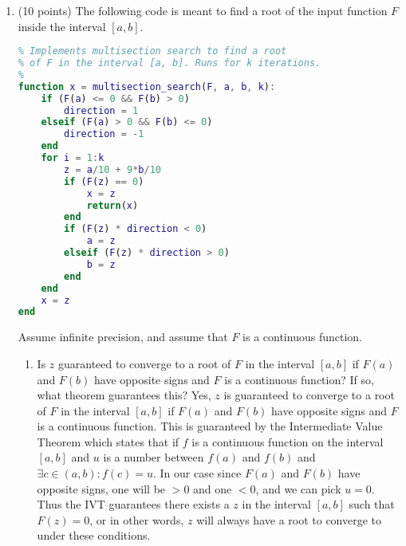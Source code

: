 \documentclass{article}
\begin{document}
\begin{enumerate}
    \newpage
    \item (10 points) The following code is meant to find a root of the input function $F$ inside the interval $[a, b]$.
    \begin{lstlisting}[language=MATLAB]
%
% Implements multisection search to find a root
% of F in the interval [a, b]. Runs for k iterations.
%
function x = multisection_search(F, a, b, k):
    if (F(a) <= 0 && F(b) > 0)
        direction = 1
    elseif (F(a) > 0 && F(b) <= 0)
        direction = -1
    end
    for i = 1:k
        z = a/10 + 9*b/10
        if (F(z) == 0)
            x = z
            return(x)
        end
        if (F(z) * direction < 0)
            a = z
        elseif (F(z) * direction > 0)
            b = z
        end
    end
    x = z
end
    \end{lstlisting}
    Assume infinite precision, and assume that $F$ is a continuous function.
    \begin{enumerate}
        \item Is $z$ guaranteed to converge to a root of $F$ in the interval $[a, b]$ if $F(a)$ and $F(b)$ have opposite signs and $F$ is a continuous function? If so, what theorem guarantees this?
        \newline
        \newline
        Yes, $z$ is guaranteed to converge to a root of $F$ in the interval $[a, b]$ if $F(a)$ and $F(b)$ have opposite signs and $F$ is a continuous function. This is guaranteed by the Intermediate Value Theorem which states that if $f$ is a continuous function on the interval $[a, b]$ and $u$ is a number between $f(a)$ and $f(b)$ and $\exists c \in (a, b): f(c) = u$. In our case since $F(a)$ and $F(b)$ have opposite signs, one will be $>0$ and one $<0$, and we can pick $u = 0$. Thus the IVT guarantees there exists a $z$ in the interval $[a, b]$ such that $F(z) = 0$, or in other words, $z$ will always have a root to converge to under these conditions. 
        

\end{enumerate}
\end{enumerate}
\end{document}
